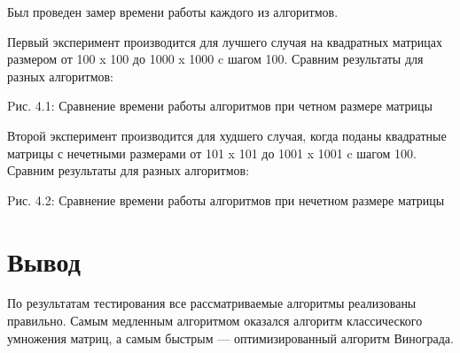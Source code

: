 \documentclass[12pt]{report}
\begin{document}
Был проведен замер времени работы каждого из алгоритмов.

Первый эксперимент производится для лучшего случая на квадратных матрицах размером от 100 x 100 до 1000 x 1000 c шагом 100. 
Сравним результаты для разных алгоритмов:

\begin{center}
Pис. 4.1: Сравнение времени работы алгоритмов при четном размере матрицы
\end{center}

\newpage
Второй эксперимент производится для худшего случая, когда поданы квадратные матрицы с нечетными размерами от 101 x 101 до 1001 x 1001 c шагом 100. 
Сравним результаты для разных алгоритмов:

\begin{center}
Pис. 4.2: Сравнение времени работы алгоритмов при нечетном размере матрицы
\end{center}


\section{Вывод}
По результатам тестирования все рассматриваемые алгоритмы реализованы правильно. Самым медленным алгоритмом оказался алгоритм классического умножения матриц, а самым быстрым — оптимизированный алгоритм Винограда.
\end{document}
